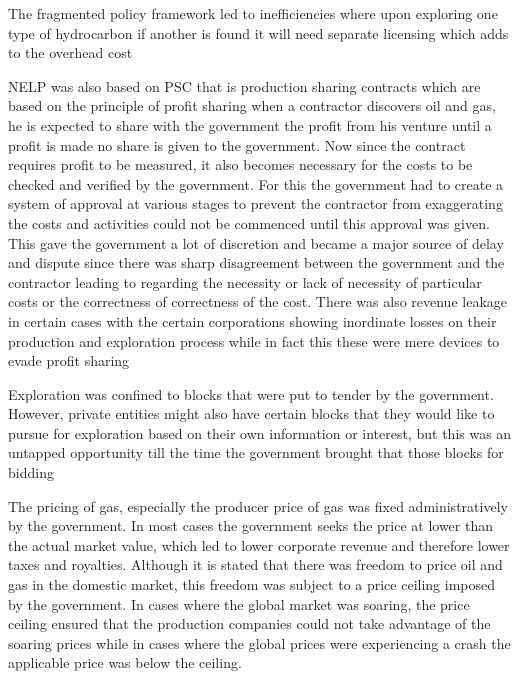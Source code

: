 \documentclass[12pt]{article}
\begin{document}
The fragmented policy framework led to inefficiencies where upon exploring one type of hydrocarbon if another is found it will need separate licensing which adds to the overhead cost

NELP was also based on PSC that is production sharing contracts which are based on the principle of profit sharing when a contractor discovers oil and gas, he is expected to share with the government the profit from his venture until a profit is made no share is given to the government. Now since the contract requires profit to be measured, it also becomes necessary for the costs to be checked and verified by the government. For this the government had to create a system of approval at various stages to prevent the contractor from exaggerating the costs and activities could not be commenced until this approval was given. This gave the government a lot of discretion and became a major source of delay and dispute since there was sharp disagreement between the government and the contractor leading to regarding the necessity or lack of necessity of particular costs or the correctness of correctness of the cost. There was also revenue leakage in certain cases with the certain corporations showing inordinate losses on their production and exploration process while in fact this these were mere devices to evade profit sharing

Exploration was confined to blocks that were put to tender by the government. However, private entities might also have certain blocks that they would like to pursue for exploration based on their own information or interest, but this was an untapped opportunity till the time the government brought that those blocks for bidding

The pricing of gas, especially the producer price of gas was fixed administratively by the government. In most cases the government seeks the price at lower than the actual market value, which led to lower corporate revenue and therefore lower taxes and royalties. Although it is stated that there was freedom to price oil and gas in the domestic market, this freedom was subject to a price ceiling imposed by the government. In cases where the global market was soaring, the price ceiling ensured that the production companies could not take advantage of the soaring prices while in cases where the global prices were experiencing a crash the applicable price was below the ceiling.
\end{document}
